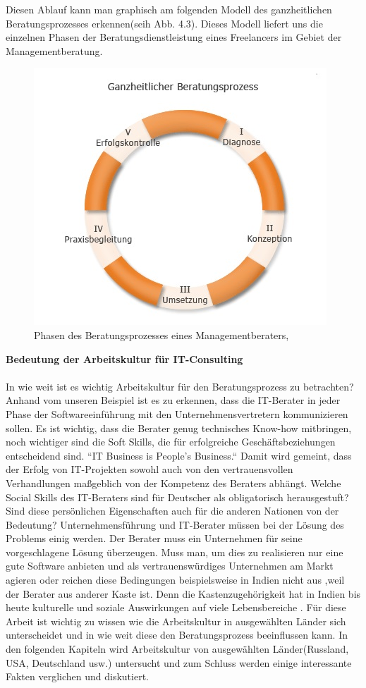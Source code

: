 	Diesen Ablauf kann man graphisch am folgenden Modell des ganzheitlichen Beratungsprozesses erkennen(seih Abb. 4.3). Dieses Modell liefert uns die einzelnen Phasen der Beratungsdienstleistung eines Freelancers im Gebiet der Managementberatung. 
\begin{figure}[htp]
\centering
\includegraphics[width=0.7\linewidth]{./images/beratungsproz}
\caption{Phasen des Beratungsprozesses  eines Managementberaters, \cite{PhasenBeratungsprozess} }
\label{fig:beratungsproz}
\end{figure}
	
	\textbf{ Bedeutung der Arbeitskultur für IT-Consulting}\\ \\
	In wie weit ist es wichtig Arbeitskultur für den Beratungsprozess zu betrachten? Anhand vom unseren Beispiel ist es zu erkennen, dass die IT-Berater in jeder Phase der Softwareeinführung mit den Unternehmensvertretern kommunizieren sollen. Es ist wichtig, dass die Berater genug technisches Know-how mitbringen, noch wichtiger sind die Soft Skills, die für erfolgreiche Geschäftsbeziehungen entscheidend sind. ``IT Business is People's Business.`` Damit wird gemeint, dass der Erfolg von   IT-Projekten sowohl auch von den vertrauensvollen Verhandlungen maßgeblich von der Kompetenz des Beraters abhängt. \cite{ITConsRu}
	Welche Social Skills des IT-Beraters sind für Deutscher als obligatorisch herausgestuft? Sind diese persönlichen Eigenschaften auch für die anderen Nationen von der Bedeutung? Unternehmensführung und IT-Berater müssen bei der Lösung des Problems einig werden. Der Berater muss ein Unternehmen für seine vorgeschlagene Lösung überzeugen. Muss man, um dies zu realisieren nur eine gute Software anbieten und als vertrauenswürdiges Unternehmen am Markt agieren oder reichen diese Bedingungen beispielsweise in Indien nicht aus ,weil der Berater aus anderer Kaste ist. Denn die Kastenzugehörigkeit hat in Indien bis heute kulturelle und soziale Auswirkungen auf viele Lebensbereiche \cite{KastensystemInd}.
	Für diese Arbeit ist wichtig zu wissen wie die Arbeitskultur in ausgewählten Länder sich unterscheidet und in wie weit diese den Beratungsprozess beeinflussen kann.
	In den folgenden Kapiteln wird Arbeitskultur von ausgewählten Länder(Russland, USA, Deutschland usw.) untersucht und zum Schluss werden einige interessante Fakten verglichen und diskutiert. 

